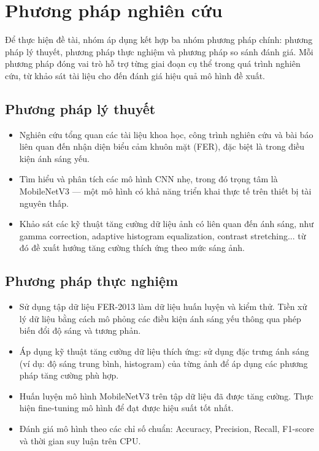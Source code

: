 \section{Phương pháp nghiên cứu} %

Để thực hiện đề tài, nhóm áp dụng kết hợp ba nhóm phương pháp chính: phương pháp lý thuyết, phương pháp thực nghiệm và phương pháp so sánh đánh giá. Mỗi phương pháp đóng vai trò hỗ trợ từng giai đoạn cụ thể trong quá trình nghiên cứu, từ khảo sát tài liệu cho đến đánh giá hiệu quả mô hình đề xuất.

\subsection{Phương pháp lý thuyết}

\begin{itemize}
    \item Nghiên cứu tổng quan các tài liệu khoa học, công trình nghiên cứu và bài báo liên quan đến nhận diện biểu cảm khuôn mặt (FER), đặc biệt là trong điều kiện ánh sáng yếu.
    \item Tìm hiểu và phân tích các mô hình CNN nhẹ, trong đó trọng tâm là MobileNetV3 — một mô hình có khả năng triển khai thực tế trên thiết bị tài nguyên thấp.
    \item Khảo sát các kỹ thuật tăng cường dữ liệu ảnh có liên quan đến ánh sáng, như gamma correction, adaptive histogram equalization, contrast stretching... từ đó đề xuất hướng tăng cường thích ứng theo mức sáng ảnh.
\end{itemize}

\subsection{Phương pháp thực nghiệm}

\begin{itemize}
    \item Sử dụng tập dữ liệu FER-2013 làm dữ liệu huấn luyện và kiểm thử. Tiền xử lý dữ liệu bằng cách mô phỏng các điều kiện ánh sáng yếu thông qua phép biến đổi độ sáng và tương phản.
    \item Áp dụng kỹ thuật tăng cường dữ liệu thích ứng: sử dụng đặc trưng ánh sáng (ví dụ: độ sáng trung bình, histogram) của từng ảnh để áp dụng các phương pháp tăng cường phù hợp.
    \item Huấn luyện mô hình MobileNetV3 trên tập dữ liệu đã được tăng cường. Thực hiện fine-tuning mô hình để đạt được hiệu suất tốt nhất.
    \item Đánh giá mô hình theo các chỉ số chuẩn: Accuracy, Precision, Recall, F1-score và thời gian suy luận trên CPU.
\end{itemize}

